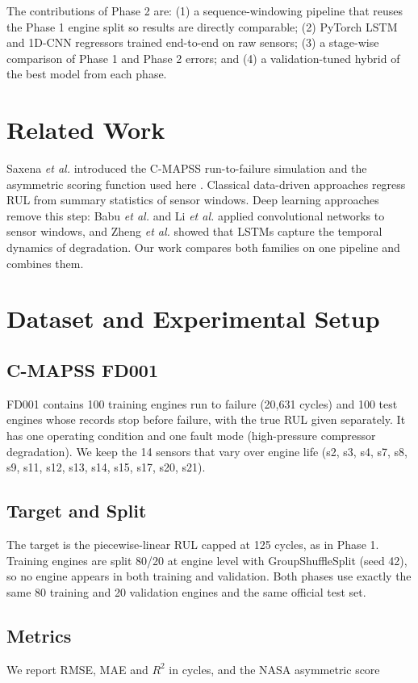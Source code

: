 \documentclass[conference]{IEEEtran}
\begin{document}
The contributions of Phase 2 are: (1) a sequence-windowing pipeline that reuses the Phase 1 engine split so results are directly comparable; (2) PyTorch LSTM and 1D-CNN regressors trained end-to-end on raw sensors; (3) a stage-wise comparison of Phase 1 and Phase 2 errors; and (4) a validation-tuned hybrid of the best model from each phase.


\section{Related Work}
Saxena \textit{et al.} introduced the C-MAPSS run-to-failure simulation and the asymmetric scoring function used here \cite{r1}. Classical data-driven approaches regress RUL from summary statistics of sensor windows. Deep learning approaches remove this step: Babu \textit{et al.} \cite{r3} and Li \textit{et al.} \cite{r5} applied convolutional networks to sensor windows, and Zheng \textit{et al.} \cite{r4} showed that LSTMs \cite{r2} capture the temporal dynamics of degradation. Our work compares both families on one pipeline and combines them.


\section{Dataset and Experimental Setup}
\subsection{C-MAPSS FD001}
FD001 contains 100 training engines run to failure (20,631 cycles) and 100 test engines whose records stop before failure, with the true RUL given separately. It has one operating condition and one fault mode (high-pressure compressor degradation). We keep the 14 sensors that vary over engine life (s2, s3, s4, s7, s8, s9, s11, s12, s13, s14, s15, s17, s20, s21).

\subsection{Target and Split}
The target is the piecewise-linear RUL capped at 125 cycles, as in Phase 1. Training engines are split 80/20 at engine level with GroupShuffleSplit (seed 42), so no engine appears in both training and validation. Both phases use exactly the same 80 training and 20 validation engines and the same official test set.

\subsection{Metrics}
We report RMSE, MAE and $R^2$ in cycles, and the NASA asymmetric score
\end{document}
